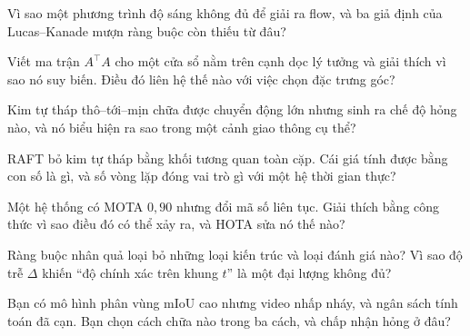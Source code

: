 \documentclass[../../../deep_learning.tex]{subfiles}
\begin{document}
\begin{tukiem}
\item Vì sao một phương trình độ sáng không đủ để giải ra flow, và ba giả định của Lucas--Kanade mượn ràng buộc còn thiếu từ đâu?
\item Viết ma trận \(A^{\!\top}\!A\) cho một cửa sổ nằm trên cạnh dọc lý tưởng và giải thích vì sao nó suy biến. Điều đó liên hệ thế nào với việc chọn đặc trưng góc?
\item Kim tự tháp thô--tới--mịn chữa được chuyển động lớn nhưng sinh ra chế độ hỏng nào, và nó biểu hiện ra sao trong một cảnh giao thông cụ thể?
\item RAFT bỏ kim tự tháp bằng khối tương quan toàn cặp. Cái giá tính được bằng con số là gì, và số vòng lặp đóng vai trò gì với một hệ thời gian thực?
\item Một hệ thống có MOTA \(0{,}90\) nhưng đổi mã số liên tục. Giải thích bằng công thức vì sao điều đó có thể xảy ra, và HOTA sửa nó thế nào?
\item Ràng buộc nhân quả loại bỏ những loại kiến trúc và loại đánh giá nào? Vì sao độ trễ \(\Delta\) khiến ``độ chính xác trên khung \(t\)'' là một đại lượng không đủ?
\item Bạn có mô hình phân vùng mIoU cao nhưng video nhấp nháy, và ngân sách tính toán đã cạn. Bạn chọn cách chữa nào trong ba cách, và chấp nhận hỏng ở đâu?
\end{tukiem}
\ifSubfilesClassLoaded{\printbibliography[title={Nguồn}]}{}
\end{document}
